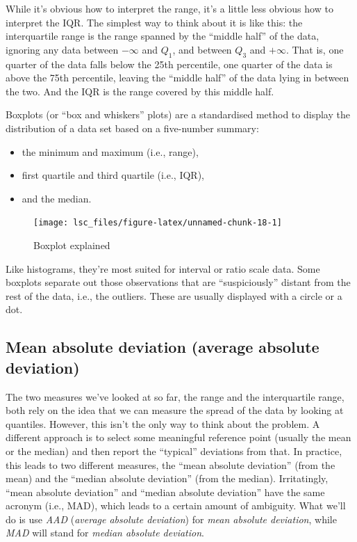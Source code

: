 \documentclass[
  11pt,
]{book}
\providecommand{\tightlist}{%
  \setlength{\itemsep}{0pt}\setlength{\parskip}{0pt}}
\theoremstyle{indenteddefinition}
\theoremstyle{indenteddefinition}
\theoremstyle{definition}
\theoremstyle{definition}
\theoremstyle{remark}
\begin{document}
While it's obvious how to interpret the range, it's a little less obvious how to interpret the IQR. The simplest way to think about it is like this: the interquartile range is the range spanned by the ``middle half'' of the data, ignoring any data between \(-\infty\) and \(Q_1\), and between \(Q_3\) and \(+\infty\). That is, one quarter of the data falls below the 25th percentile, one quarter of the data is above the 75th percentile, leaving the ``middle half'' of the data lying in between the two. And the IQR is the range covered by this middle half.

\hypertarget{boxplot}{}
\begin{callout}[Boxplots]

Boxplots (or ``box and whiskers'' plots) are a standardised method to display the distribution of a data set based on a five-number summary:

\nopagebreak

\begin{itemize}
\tightlist
\item
  the minimum and maximum (i.e., range),
\item
  first quartile and third quartile (i.e., IQR),
\item
  and the median.
\end{itemize}

\begin{figure}

{\centering \texttt{[image: lsc\_files/figure-latex/unnamed-chunk-18-1]} 

}

\caption{Boxplot explained}\label{fig:unnamed-chunk-18}
\end{figure}

Like histograms, they're most suited for interval or ratio scale data. Some boxplots separate out those observations that are ``suspiciously'' distant from the rest of the data, i.e., the outliers. These are usually displayed with a circle or a dot.

\end{callout}

\hypertarget{aad}{%
\subsection{Mean absolute deviation (average absolute deviation)}\label{aad}}

The two measures we've looked at so far, the range and the interquartile range, both rely on the idea that we can measure the spread of the data by looking at quantiles. However, this isn't the only way to think about the problem. A different approach is to select some meaningful reference point (usually the mean or the median) and then report the ``typical'' deviations from that. In practice, this leads to two different measures, the ``mean absolute deviation'' (from the mean) and the ``median absolute deviation'' (from the median). Irritatingly, ``mean absolute deviation'' and ``median absolute deviation'' have the same acronym (i.e., MAD), which leads to a certain amount of ambiguity. What we'll do is use \emph{AAD} (\emph{average absolute deviation}) for \emph{mean absolute deviation}, while \emph{MAD} will stand for \emph{median absolute deviation}.
\end{document}

